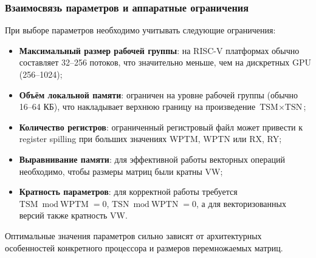 \subsubsection{Взаимосвязь параметров и аппаратные ограничения}

При выборе параметров необходимо учитывать следующие ограничения:

\begin{itemize}
    \item \textbf{Максимальный размер рабочей группы}: на RISC-V платформах обычно составляет 32--256 потоков, что значительно меньше, чем на дискретных GPU (256--1024);
    \item \textbf{Объём локальной памяти}: ограничен на уровне рабочей группы (обычно 16--64 КБ), что накладывает верхнюю границу на произведение $\text{TSM} \times \text{TSN}$;
    \item \textbf{Количество регистров}: ограниченный регистровый файл может привести к register spilling при больших значениях WPTM, WPTN или RX, RY;
    \item \textbf{Выравнивание памяти}: для эффективной работы векторных операций необходимо, чтобы размеры матриц были кратны VW;
    \item \textbf{Кратность параметров}: для корректной работы требуется $\text{TSM} \bmod \text{WPTM} = 0$, $\text{TSN} \bmod \text{WPTN} = 0$, а для векторизованных версий также кратность VW.
\end{itemize}

Оптимальные значения параметров сильно зависят от архитектурных особенностей конкретного процессора и размеров перемножаемых матриц.
